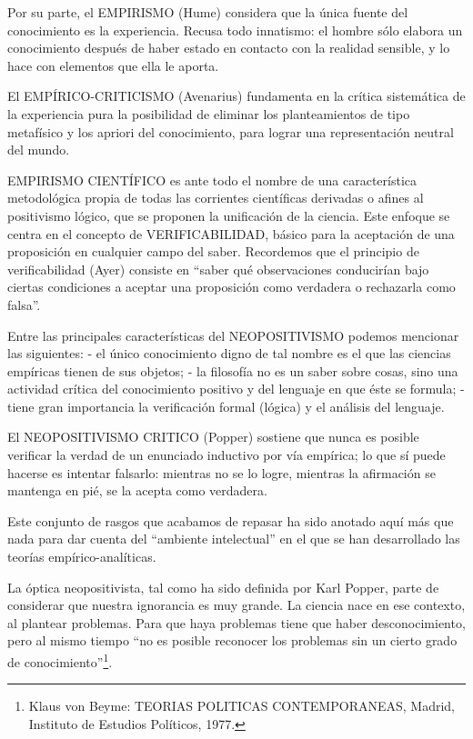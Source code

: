 \documentclass[
]{book}
\begin{document}
Por su parte, el EMPIRISMO (Hume) considera que la única fuente del conocimiento es la experiencia. Recusa todo innatismo: el hombre sólo elabora un conocimiento después de haber estado en contacto con la realidad sensible, y lo hace con elementos que ella le aporta.

El EMPÍRICO-CRITICISMO (Avenarius) fundamenta en la crítica sistemática de la experiencia pura la posibilidad de eliminar los planteamientos de tipo metafísico y los apriori del conocimiento, para lograr una representación neutral del mundo.

EMPIRISMO CIENTÍFICO es ante todo el nombre de una característica metodológica propia de todas las corrientes científicas derivadas o afines al positivismo lógico, que se proponen la unificación de la ciencia. Este enfoque se centra en el concepto de VERIFICABILIDAD, básico para la aceptación de una proposición en cualquier campo del saber. Recordemos que el principio de verificabilidad (Ayer) consiste en ``saber qué observaciones conducirían bajo ciertas condiciones a aceptar una proposición como verdadera o rechazarla como falsa''.

Entre las principales características del NEOPOSITIVISMO podemos mencionar las siguientes: - el único conocimiento digno de tal nombre es el que las ciencias empíricas tienen de sus objetos; - la filosofía no es un saber sobre cosas, sino una actividad crítica del conocimiento positivo y del lenguaje en que éste se formula; - tiene gran importancia la verificación formal (lógica) y el análisis del lenguaje.

El NEOPOSITIVISMO CRITICO (Popper) sostiene que nunca es posible verificar la verdad de un enunciado inductivo por vía empírica; lo que sí puede hacerse es intentar falsarlo: mientras no se lo logre, mientras la afirmación se mantenga en pié, se la acepta como verdadera.

Este conjunto de rasgos que acabamos de repasar ha sido anotado aquí más que nada para dar cuenta del ``ambiente intelectual'' en el que se han desarrollado las teorías empírico-analíticas.

La óptica neopositivista, tal como ha sido definida por Karl Popper, parte de considerar que nuestra ignorancia es muy grande. La ciencia nace en ese contexto, al plantear problemas. Para que haya problemas tiene que haber desconocimiento, pero al mismo tiempo ``no es posible reconocer los problemas sin un cierto grado de conocimiento''\footnote{Klaus von Beyme: TEORIAS POLITICAS CONTEMPORANEAS, Madrid, Instituto de Estudios Políticos, 1977.}.
\end{document}
